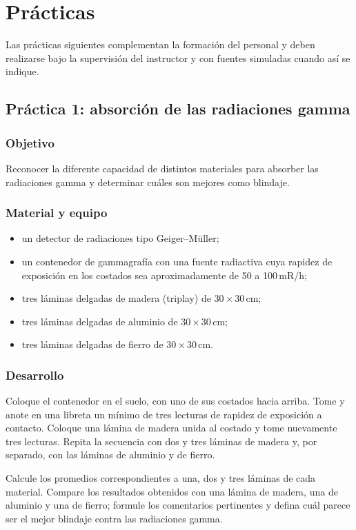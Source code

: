 \chapter{Prácticas}

Las prácticas siguientes complementan la formación del personal y deben realizarse bajo la supervisión del instructor y con fuentes simuladas cuando así se indique.

\section{Práctica 1: absorción de las radiaciones gamma}

\subsection*{Objetivo}
Reconocer la diferente capacidad de distintos materiales para absorber las radiaciones gamma y determinar cuáles son mejores como blindaje.

\subsection*{Material y equipo}
\begin{itemize}
  \item un detector de radiaciones tipo Geiger--Müller;
  \item un contenedor de gammagrafía con una fuente radiactiva cuya rapidez de exposición en los costados sea aproximadamente de 50 a 100\,mR/h;
  \item tres láminas delgadas de madera (triplay) de $30\times30$\,cm;
  \item tres láminas delgadas de aluminio de $30\times30$\,cm;
  \item tres láminas delgadas de fierro de $30\times30$\,cm.
\end{itemize}

\subsection*{Desarrollo}
Coloque el contenedor en el suelo, con uno de sus costados hacia arriba. Tome y anote en una libreta un mínimo de tres lecturas de rapidez de exposición a contacto. Coloque una lámina de madera unida al costado y tome nuevamente tres lecturas. Repita la secuencia con dos y tres láminas de madera y, por separado, con las láminas de aluminio y de fierro.

Calcule los promedios correspondientes a una, dos y tres láminas de cada material. Compare los resultados obtenidos con una lámina de madera, una de aluminio y una de fierro; formule los comentarios pertinentes y defina cuál parece ser el mejor blindaje contra las radiaciones gamma.


